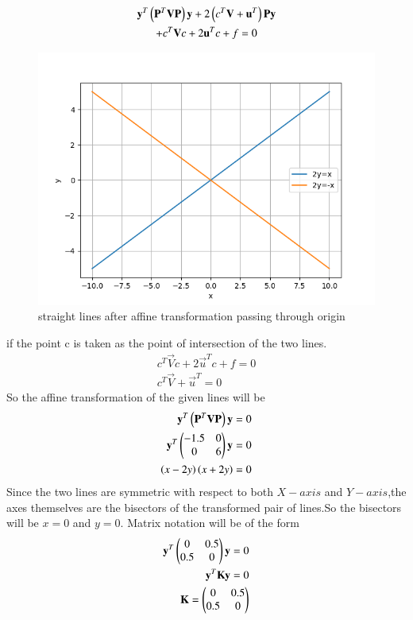     \begin{multline}
        \mathbf{y}^T\left(\mathbf{P}^T\mathbf{V}\mathbf{P}\right)\mathbf{y}+2\left(c^T\mathbf{V}+\mathbf{u}^T\right)\mathbf{P}\mathbf{y}\\
        +c^T\mathbf{V}c+2\mathbf{u}^Tc+f=0
\label{eq:solutions/2/6/22/eq:5}
    \end{multline}
\begin{figure}[t]
    \centering
    \includegraphics[width=\columnwidth]{./solutions/2/6/22/Fig1_a5.png}
    \caption{straight lines after affine transformation passing through origin}
    \label{eq:solutions/2/6/22/fig:1}
\end{figure}
if the point c is taken as the point of intersection of the two lines.
\begin{align}
    c^T\vec{V}c+2\vec{u}^Tc+f=0\\
    c^T\vec{V}+\vec{u}^T=0
\end{align}
So the affine transformation of the given lines will be
\begin{align}
    \mathbf{y}^T\left(\mathbf{P}^T\mathbf{V}\mathbf{P}\right)\mathbf{y}=0\\
    \mathbf{y}^T\begin{pmatrix}-1.5&0\\0&6\end{pmatrix}\mathbf{y}=0\\
    \left(x-2y\right)\left(x+2y\right)=0
\end{align}
Since the two lines are symmetric with respect to both $X-axis$ and $Y-axis$,the axes themselves are the bisectors of the transformed pair of lines.So the bisectors will be $x=0$ and $y=0$.
Matrix notation will be of the form
\begin{align}
    \mathbf{y}^T\begin{pmatrix}0&0.5\\0.5&0\end{pmatrix}\mathbf{y}=0\\
    \mathbf{y}^T\mathbf{K}\mathbf{y}=0\\
    \mathbf{K}=\begin{pmatrix}0&0.5\\0.5&0\end{pmatrix}
\end{align}
